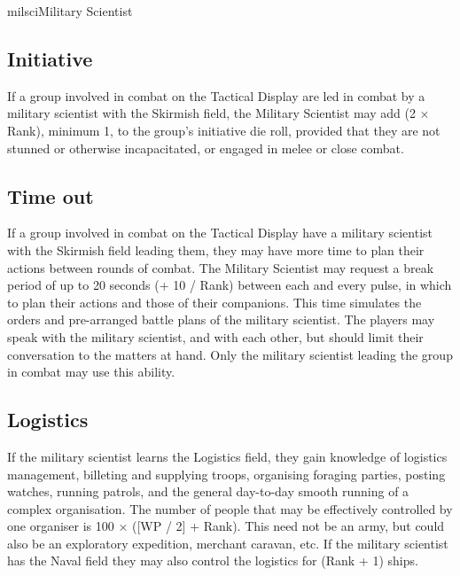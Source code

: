 \begin{Skill}[2.1]{milsci}{Military Scientist}
\subsection{Initiative}

If a group involved in combat on the Tactical Display are led in
combat by a military scientist with the Skirmish field, the Military
Scientist may add (2 × Rank), minimum 1, to the group’s initiative die
roll, provided that they are not stunned or otherwise incapacitated,
or engaged in melee or close combat.

\subsection{Time out}

If a group involved in combat on the Tactical Display have a military
scientist with the Skirmish field leading them, they may have more
time to plan their actions between rounds of combat.  The Military
Scientist may request a break period of up to 20 seconds (+ 10 / Rank)
between each and every pulse, in which to plan their actions and those
of their companions. This time simulates the orders and pre-arranged
battle plans of the military scientist.  The players may speak with
the military scientist, and with each other, but should limit their
conversation to the matters at hand. Only the military scientist
leading the group in combat may use this ability.

\subsection{Logistics}

If the military scientist learns the Logistics field, they gain
knowledge of logistics management, billeting and supplying troops,
organising foraging parties, posting watches, running patrols, and the
general day-to-day smooth running of a complex organisation.  The
number of people that may be effectively controlled by one organiser
is 100 × ([WP / 2] + Rank).  This need not be an army, but could also
be an exploratory expedition, merchant caravan, etc. If the military
scientist has the Naval field they may also control the logistics for
(Rank + 1) ships.

\end{Skill}
